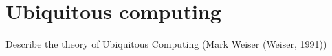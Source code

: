 \section{Ubiquitous computing}
Describe the theory of Ubiquitous Computing (Mark Weiser (Weiser, 1991))
\newpage
